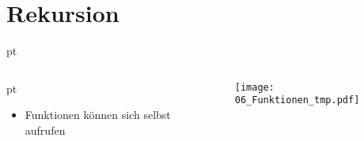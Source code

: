 
\section{Rekursion}
\begin{frame}[t]
    \slidehead

     pt
    \begin{columns}
        \begin{column}{4.5cm}
             pt
            \begin{itemize}
                \item Funktionen können sich selbst aufrufen
            \end{itemize}
        \end{column}

        \begin{column}{7cm}
            \begin{figure}
                    \texttt{[image: 06\_Funktionen\_tmp.pdf]}
            \end{figure}
        \end{column}
    \end{columns}
\end{frame}

